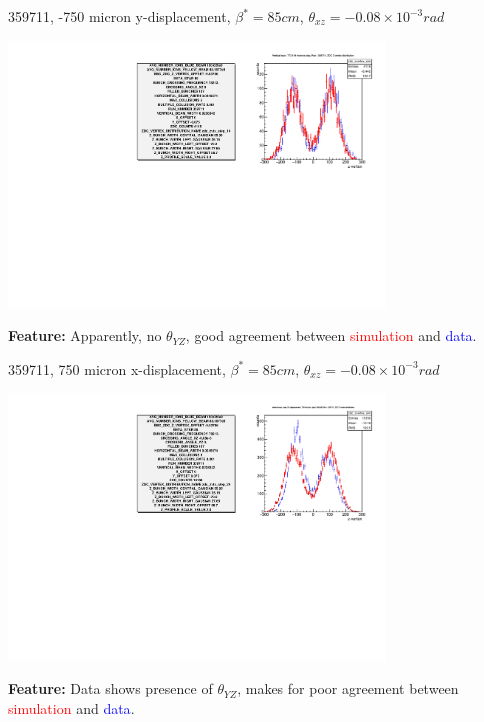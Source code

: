 \begin{frame}{359711, -750 micron y-displacement, $\beta^{*} = 85 cm$, $\theta_{xz} = -0.08\times10^{-3}rad$}
\begin{center}
\includegraphics[width=10cm,scale=0.8]{../HourglassResults/figs/359711_step14_config_compare.pdf}
\end{center}
\textbf{Feature:} Apparently, no $\theta_{YZ}$, good agreement between
\textcolor{red}{simulation} and \textcolor{blue}{data}.
\end{frame}

\begin{frame}{359711, 750 micron x-displacement, $\beta^{*} = 85 cm$, $\theta_{xz} = -0.08\times10^{-3}rad$}
\begin{center}
\includegraphics[width=10cm,scale=0.8]{../HourglassResults/figs/359711_step24_config_compare.pdf}
\end{center}
\textbf{Feature:} Data shows presence of $\theta_{YZ}$, makes for poor agreement between \textcolor{red}{simulation} and \textcolor{blue}{data}.
\end{frame}

